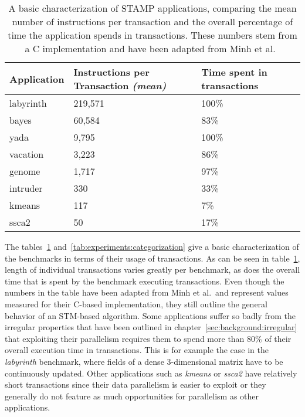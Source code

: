 \begin{table}
    \centering
    \begin{tabular}{|l|l|l|}
        \hline
        \textbf{Application} & \textbf{Instructions per Transaction} \emph{(mean)} & \textbf{Time spent in transactions}\\\hline\hline
        labyrinth & 219,571 & 100\%\\\hline
        bayes & 60,584 & 83\%\\\hline
        yada & 9,795 & 100\%\\\hline
        vacation & 3,223 & 86\%\\\hline
        genome & 1,717 & 97\%\\\hline
        intruder & 330 & 33\%\\\hline
        kmeans & 117 & 7\%\\\hline
        ssca2 & 50 & 17\%\\\hline
    \end{tabular}
    \caption{A basic characterization of STAMP applications, comparing the mean number of instructions per transaction and the overall percentage of time the application spends in transactions. These numbers stem from a C implementation and have been adapted from Minh et al.~\cite{minh2008stamp}}
    \label{tab:experiments:overview}
\end{table}

The tables~\ref{tab:experiments:overview} and~\ref{tab:experiments:categorization} give a basic characterization of the benchmarks in terms of their usage of transactions.
As can be seen in table~\ref{tab:experiments:overview}, length of individual transactions varies greatly per benchmark, as does the overall time that is spent by the benchmark executing transactions.
Even though the numbers in the table have been adapted from Minh et al.\ and represent values measured for their C-based implementation, they still outline the general behavior of an STM-based algorithm.
Some applications suffer so badly from the irregular properties that have been outlined in chapter~\ref{sec:background:irregular} that exploiting their parallelism requires them to spend more than 80\% of their overall execution time in transactions.
This is for example the case in the \emph{labyrinth} benchmark, where fields of a dense 3-dimensional matrix have to be continuously updated.
Other applications such as \emph{kmeans} or \emph{ssca2} have relatively short transactions since their data parallelism is easier to exploit or they generally do not feature as much opportunities for parallelism as other applications.

